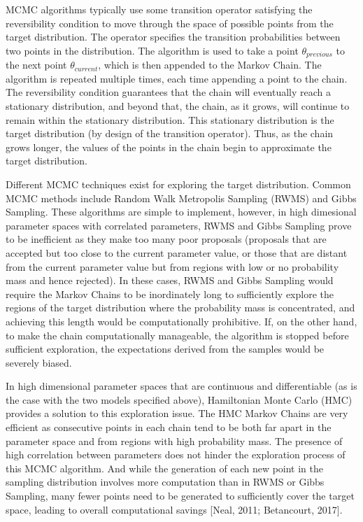 \documentclass[12pt,letterpaper,reqno,fleqn]{article}
\begin{document}
MCMC algorithms typically use some transition operator satisfying the reversibility condition to move through the space of possible points from the target distribution. The operator specifies the transition probabilities between two points in the distribution. The algorithm is used to take a point $\theta_{previous}$ to the next point $\theta_{current}$, which is then appended to the Markov Chain. The algorithm is repeated multiple times, each time appending a point to the chain. The reversibility condition guarantees that the chain will eventually reach a stationary distribution, and beyond that, the chain, as it grows, will continue to remain within the stationary distribution. This stationary distribution is the target distribution (by design of the transition operator). Thus, as the chain grows longer, the values of the points in the chain begin to approximate the target distribution.

Different MCMC techniques exist for exploring the target distribution. Common MCMC methods include Random Walk Metropolis Sampling (RWMS) and Gibbs Sampling. These algorithms are simple to implement, however, in high dimesional parameter spaces with correlated parameters, RWMS and Gibbs Sampling prove to be inefficient as they make too many poor proposals (proposals that are accepted but too close to the current parameter value, or those that are distant from the current parameter value but from regions with low or no probability mass and hence rejected). In these cases, RWMS and Gibbs Sampling would require the Markov Chains to be inordinately long to sufficiently explore the regions of the target distribution where the probability mass is concentrated, and achieving this length would be computationally prohibitive. If, on the other hand, to make the chain computationally manageable, the algorithm is stopped before sufficient exploration, the expectations derived from the samples would be severely biased.

In high dimensional parameter spaces that are continuous and differentiable (as is the case with the two models specified above), Hamiltonian Monte Carlo (HMC) provides a solution to this exploration issue. The HMC Markov Chains are very efficient as consecutive points in each chain tend to be both far apart in the parameter space and from regions with high probability mass. The presence of high correlation between parameters does not hinder the exploration process of this MCMC algorithm. And while the generation of each new point in the sampling distribution involves more computation than in RWMS or Gibbs Sampling, many fewer points need to be generated to sufficiently cover the target space, leading to overall computational savings [Neal, 2011; Betancourt, 2017].
\end{document}
